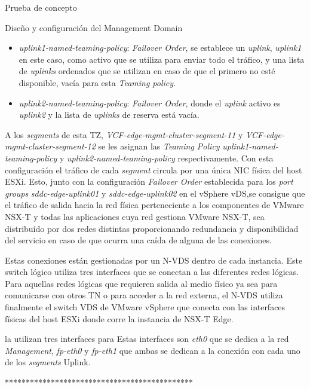 \begin{section}{Prueba de concepto}
\begin{subsection}{Diseño y configuración del Management Domain}
\begin{itemize}
\begin{itemize}
          \item \textit{uplink1-named-teaming-policy}: \textit{Failover Order}, se establece un \textit{uplink}, \textit{uplink1} en este caso, como activo que se utiliza para enviar todo el tráfico, y una lista de \textit{uplinks} ordenados que se utilizan en caso de que el primero no esté disponible, vacía para esta \textit{Teaming policy}.
          \item \textit{uplink2-named-teaming-policy}: \textit{Failover Order}, donde el \textit{uplink} activo es \textit{uplink2} y la lista de \textit{uplinks} de reserva está vacía.
        \end{itemize}
    \end{itemize}
    A los \textit{segments} de esta TZ, \textit{VCF-edge-mgmt-cluster-segment-11} y \textit{VCF-edge-mgmt-cluster-segment-12} se les asignan las \textit{Teaming Policy} \textit{uplink1-named-teaming-policy} y \textit{uplink2-named-teaming-policy} respectivamente. Con esta configuración el tráfico de cada \textit{segment} circula por una única NIC física del host ESXi. Esto, junto con la configuración \textit{Failover Order} establecida para los \textit{port groups} \textit{sddc-edge-uplink01} y \textit{sddc-edge-uplink02} en el vSphere vDS,se consigue que el tráfico de salida hacia la red física perteneciente a los componentes de VMware NSX-T y todas las aplicaciones cuya red gestiona VMware NSX-T, sea distribuído por dos redes distintas proporcionando redundancia y disponibilidad del servicio en caso de que ocurra una caída de alguna de las conexiones.
    
    
    
    Estas conexiones están gestionadas por un N-VDS dentro de cada instancia. Este switch lógico utiliza tres interfaces que se conectan a las diferentes redes lógicas. Para aquellas redes lógicas que requieren salida al medio físico ya sea para comunicarse con otros TN o para acceder a la red externa, el N-VDS utiliza finalmente el switch VDS de VMware vSphere que conecta con las interfaces físicas del host ESXi donde corre la instancia de NSX-T Edge.
    
    la utilizan tres interfaces para  Estas interfaces son \textit{eth0} que se dedica a la red \textit{Management}, \textit{fp-eth0} y \textit{fp-eth1} que ambas se dedican a la conexión con cada uno de los \textit{segments} Uplink. 
    
    
    *********************************************
    

\end{subsection}
\end{section}

